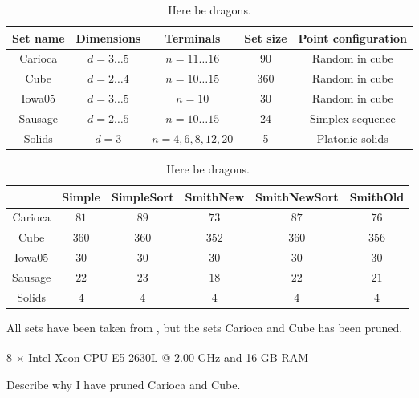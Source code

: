 \begin{table}[htbp]
  \centering
  \begin{tabular}{ccccc}
    \toprule
    Set name & Dimensions       & Terminals             & Set size & Point configuration \\
    \midrule
    Carioca  & $d = 3 \ldots 5$ & $n = 11 \ldots 16$    & 90       & Random in cube      \\
    Cube     & $d = 2 \ldots 4$ & $n = 10 \ldots 15$    & 360      & Random in cube      \\
    Iowa05   & $d = 3 \ldots 5$ & $n = 10$              & 30       & Random in cube      \\
    Sausage  & $d = 2 \ldots 5$ & $n = 10 \ldots 15$    & 24       & Simplex sequence    \\
    Solids   & $d = 3$          & $n = 4, 6, 8, 12, 20$ & 5        & Platonic solids     \\
    \bottomrule
  \end{tabular}
  \caption[Here be dragons]{Here be dragons.\label{tab:test-sets}}
\end{table}

\begin{table}[htbp]
  \centering
  \begin{tabularx}{1.0\linewidth}{cccccc}
    \toprule
            & Simple & SimpleSort & SmithNew & SmithNewSort & SmithOld \\
    \midrule
    Carioca & $81$   & $89$       & $73$     & $87$         & $76$     \\
    Cube    & $360$  & $360$      & $352$    & $360$        & $356$    \\
    Iowa05  & $30$   & $30$       & $30$     & $30$         & $30$     \\
    Sausage & $22$   & $23$       & $18$     & $22$         & $21$     \\
    Solids  & $4$    & $4$        & $4$      & $4$          & $4$      \\
    \bottomrule
  \end{tabularx}
  \caption[Here be dragons]{Here be dragons.\label{tab:set-success}}
\end{table}

All sets have been taken from \textcite{fonseca2014}, but the sets Carioca and
Cube has been pruned.

8 $\times$ Intel\textsuperscript{\textregistered}
Xeon\textsuperscript{\textregistered} CPU E5-2630L @ 2.00 GHz and 16 GB RAM

Describe why I have pruned Carioca and Cube.

